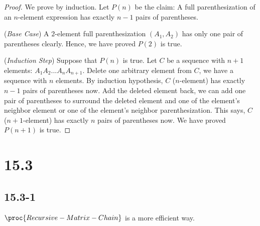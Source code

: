 \begin{proof}
    \noindent
    We prove by induction.
    Let $P(n)$ be the claim:
    A full parenthesization of an $n$-element expression 
    has exactly $n-1$ pairs of parentheses.

    \noindent
    (\textit{Base Case})
    A $2$-element full parenthesization $(A_1,A_2)$ 
    has only one pair of parentheses clearly.
    Hence, we have proved $P(2)$ is true.

    \noindent
    (\textit{Induction Step})
    Suppose that $P(n)$ is true.
    Let $C$ be a sequence with $n+1$ elements: 
    $A_1A_2...A_nA_{n+1}$.
    Delete one arbitrary element from $C$, 
    we have a sequence with $n$ elements.
    By induction hypothesis, 
    $C$ ($n$-element) has exactly $n-1$ pairs of parentheses now.
    Add the deleted element back,
    we can add one pair of parentheses to surround the deleted element
    and one of the element's neighbor element 
    or one of the element's neighbor parenthesization.
    This says, $C$ ($n+1$-element) has exactly 
    $n$ pairs of parentheses now.
    We have proved $P(n+1)$ is true.
\end{proof}

\section*{15.3}

\subsection*{15.3-1}

\noindent
$\proc{Recursive-Matrix-Chain}$ is a more efficient way.


